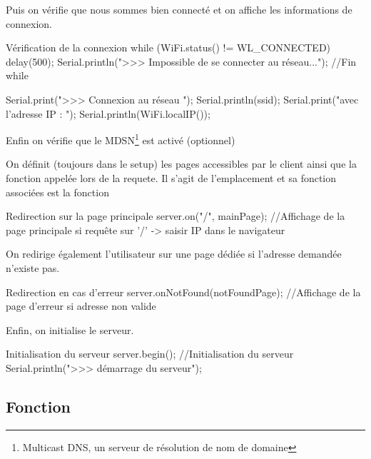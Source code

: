 Puis on vérifie que nous sommes bien connecté et on affiche les informations de connexion.

\begin{Cpp}{Vérification de la connexion}
    while (WiFi.status() != WL_CONNECTED) 
    {
        delay(500);
        Serial.println(">>> Impossible de se connecter au réseau...");
    }//Fin while
      
    Serial.print(">>> Connexion au réseau ");
    Serial.println(ssid);
    Serial.print("avec l'adresse IP : ");
    Serial.println(WiFi.localIP());            
\end{Cpp}

Enfin on vérifie que le MDSN\footnote{Multicast DNS, un serveur de résolution de nom de domaine} est activé (optionnel)
\begin{Cpp}{Vérification de la connexion}
    if (MDNS.begin("esp8266")) {   //Multicast DNS 
    Serial.println(">>> Serveur MDNS activé");
    }
}           
\end{Cpp}

On définit (toujours dans le setup) les pages accessibles par le client ainsi que la fonction appelée lors de la requete.
Il s'agit de l'emplacement  et sa fonction associées est la fonction \\

\begin{Cpp}{Redirection sur la page principale}
    server.on("/", mainPage);           //Affichage de la page principale si requête sur '/' -> saisir IP dans le navigateur
\end{Cpp}
On redirige également l'utilisateur sur une page dédiée si l'adresse demandée n'existe pas.

\begin{Cpp}{Redirection en cas d'erreur}
    server.onNotFound(notFoundPage);    //Affichage de la page d'erreur si adresse non valide
\end{Cpp}

Enfin, on initialise le serveur.

\begin{Cpp}{Initialisation du serveur}
    server.begin();                     //Initialisation du serveur
    Serial.println(">>> démarrage du serveur");
\end{Cpp}

\subsection{Fonction }

